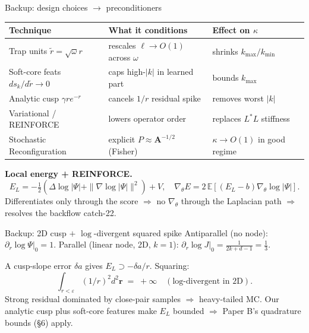\documentclass[10pt,aspectratio=169]{beamer}
\begin{document}
\begin{frame}{Backup: design choices $\to$ preconditioners}
\small
\begin{tabular}{lll}
\toprule
\textbf{Technique} & \textbf{What it conditions} & \textbf{Effect on $\kappa$} \\
\midrule
Trap units $\tilde r=\sqrt\omega r$ & rescales $\ell\!\to\!O(1)$ across $\omega$ & shrinks $k_{\max}/k_{\min}$ \\
Soft-core feats $ds_k/d\tilde r\!\to\!0$ & caps high-$|k|$ in learned part & bounds $k_{\max}$ \\
Analytic cusp $\gamma r e^{-r}$ & cancels $1/r$ residual spike & removes worst $|k|$ \\
Variational / REINFORCE & lowers operator order & replaces $L^\ast L$ stiffness \\
Stochastic Reconfiguration & explicit $P\!\approx\!\mathbf A^{-1/2}$ (Fisher) & $\kappa\!\to\!O(1)$ in good regime \\
\bottomrule
\end{tabular}

\vspace{6pt}
\textbf{Local energy + REINFORCE.}
\[
  E_L=-\tfrac12(\Delta\log|\Psi|+\|\nabla\log|\Psi|\|^2)+V,\quad
  \nabla_\theta E=2\,\mathbb E[(E_L-b)\nabla_\theta\log|\Psi|].
\]
Differentiates only through the score $\Rightarrow$ no $\nabla_\theta$ through the Laplacian path
$\Rightarrow$ resolves the backflow catch-22.
\end{frame}

\begin{frame}{Backup: 2D cusp $+$ $\log$-divergent squared spike}
\small
Antiparallel (no node): $\partial_r\log\Psi|_0=1$. Parallel (linear node, 2D, $k{=}1$):
$\partial_r\log J|_0=\tfrac{1}{2k+d-1}=\tfrac13$.

\vspace{4pt}
A cusp-slope error $\delta a$ gives $E_L\supset -\delta a/r$. Squaring:
\[
  \int_{r<\varepsilon}(1/r)^2 d^2\mathbf r \;=\; +\infty\quad(\text{log-divergent in 2D}).
\]
Strong residual dominated by close-pair samples $\Rightarrow$ heavy-tailed MC. Our analytic cusp
plus soft-core features make $E_L$ bounded $\Rightarrow$ Paper B's quadrature bounds (\S6) apply.
\end{frame}
\end{document}

